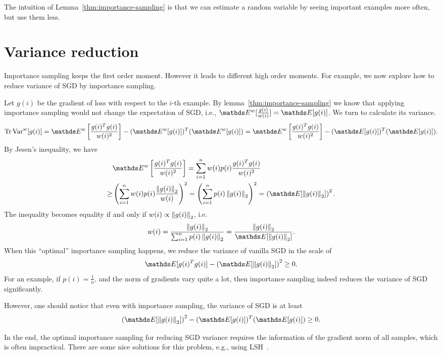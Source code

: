 \documentclass{article}
\begin{document}
The intuition of Lemma~\ref{thm:importance-sampling} is that
we can estimate a random variable by seeing important examples more often, but use them less. 


\section{Variance reduction}
Importance sampling keeps the first order moment. 
However it leads to different high order moments.
For example, we now explore how to reduce variance of SGD by importance sampling.

Let $g(i)$ be the gradient of loss with respect to the $i$-th example.
By lemma~\ref{thm:importance-sampling} we know that applying importance sampling would not change the expectation of SGD, i.e., $\Ebb^w [\frac{g(i)}{w(i)}] = \Ebb [g(i)]$.
We turn to calculate its variance.
\begin{equation}
\begin{aligned}
    \tr {\Var}^w[g(i)] = \Ebb^w \left[\frac{g(i)^T g(i)}{w(i)^2}\right] - (\Ebb^w [g(i)])^T(\Ebb^w [g(i)]) = \Ebb^w \left[\frac{g(i)^T g(i)}{w(i)^2}\right] - (\Ebb [g(i)])^T(\Ebb [g(i)]).
\end{aligned}
\end{equation}
By Jesen's inequality, we have
\begin{equation}
\begin{aligned}
    &\Ebb^w \left[\frac{g(i)^T g(i)}{w(i)^2}\right] = \sum_{i=1}^n w(i)p(i)\frac{g(i)^T g(i)}{w(i)^2} \\
    \ge& \left(\sum_{i=1}^n w(i)p(i)\frac{\norm{g(i)}_2}{w(i)}\right)^2 = \left(\sum_{i=1}^n p(i)\norm{g(i)}_2\right)^2 = \left(\Ebb[\norm{g(i)}_2]\right)^2.
\end{aligned}
\end{equation}
The inequality becomes equality if and only if $w(i)\propto \left\|g(i)\right\|_2$, i.e.
\begin{equation}
    w(i) = \frac{\norm{g(i)}_2}{\sum_{i=1}^n p(i)\norm{g(i)}_2} = \frac{\norm{g(i)}_2}{\Ebb[\norm{g(i)}_2]}.
\end{equation}
When this ``optimal'' importance sampling happens, we reduce the variance of vanilla SGD in the scale of
\begin{equation}
    \Ebb[g(i)^T g(i)] - \left(\Ebb[\norm{g(i)}_2]\right)^2 \ge 0.
\end{equation}
For an example, if $p(i) = \frac{1}{n}$, and the norm of gradients vary quite a lot, then importance sampling indeed reduces the variance of SGD significantly.

However, one should notice that even with importance sampling, the variance of SGD is at least 
\begin{equation}
    \left(\Ebb[\norm{g(i)}_2]\right)^2 - (\Ebb [g(i)])^T(\Ebb [g(i)]) \ge 0.
\end{equation}

In the end, the optimal importance sampling for reducing SGD variance requires the information of the gradient norm of all samples, which is often impractical.
There are some nice solutions for this problem, e.g., using LSH~\cite{chen2019fast}.




\end{document}
